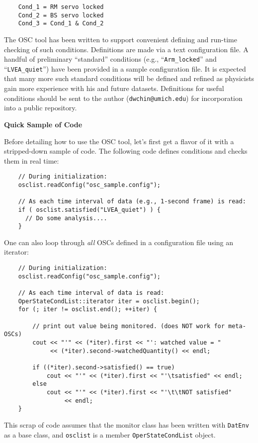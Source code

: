 \documentclass[11pt]{article}
\begin{document}
\begin{verbatim}
    Cond_1 = RM servo locked
    Cond_2 = BS servo locked
    Cond_3 = Cond_1 & Cond_2 
\end{verbatim}

The OSC tool has been written to support convenient defining and
run-time checking of such conditions. Definitions are made via a
text configuration file. A handful of preliminary ``standard'' 
conditions (e.g., ``\texttt{Arm\_locked}'' and ``\texttt{LVEA\_quiet}'') 
have been provided in a sample configuration file.  It is
expected that many more such standard conditions will be defined and
refined as physicists gain more experience with his and future
datasets. Definitions for useful conditions should be sent to the
author (\texttt{dwchin@umich.edu}) for incorporation into a public
repository.

\begin{center}
  \textbf{\large Quick Sample of Code}
\end{center}

Before detailing how to use the OSC tool, let's first get a flavor of
it with a stripped-down sample of code. The following code defines
conditions and checks them in real time:

\begin{verbatim}
    // During initialization:
    osclist.readConfig("osc_sample.config");
  
    // As each time interval of data (e.g., 1-second frame) is read: 
    if ( osclist.satisfied("LVEA_quiet") ) {
      // Do some analysis....
    }
\end{verbatim}

One can also loop through \textit{all} OSCs defined in a configuration
file using an iterator:
\begin{verbatim}
    // During initialization:
    osclist.readConfig("osc_sample.config");

    // As each time interval of data is read:
    OperStateCondList::iterator iter = osclist.begin();
    for (; iter != osclist.end(); ++iter) {

        // print out value being monitored. (does NOT work for meta-OSCs)
        cout << "'" << (*iter).first << "': watched value = "
             << (*iter).second->watchedQuantity() << endl;

        if ((*iter).second->satisfied() == true)
            cout << "'" << (*iter).first << "'\tsatisfied" << endl;
        else 
            cout << "'" << (*iter).first << "'\t\tNOT satisfied" 
                 << endl;
    }
\end{verbatim}
This scrap of code assumes that the monitor class has been written
with \texttt{DatEnv} as a base class, and \texttt{osclist} is a member 
\texttt{OperStateCondList} object.
\end{document}
